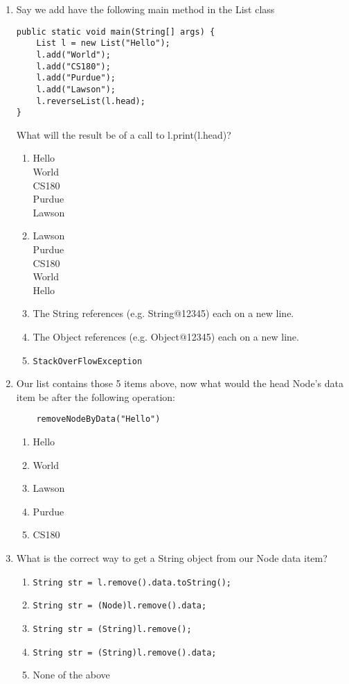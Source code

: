 \documentclass[S17-Final.tex]{subfiles}
\begin{document}
\begin{enumerate}
\item Say we add have the following main method in the List class
\begin{lstlisting}
public static void main(String[] args) {
    List l = new List("Hello");
    l.add("World");
    l.add("CS180");
    l.add("Purdue");
    l.add("Lawson");
    l.reverseList(l.head);
}
\end{lstlisting}
	
What will the result be of a call to l.print(l.head)?

\begin{enumerate}
\item  Hello\\
	    World\\
	    CS180\\
	    Purdue\\
	    Lawson \ifdraft \Ans \fi 
\item  Lawson\\
	    Purdue\\
	    CS180\\
    World\\
    Hello
\item  The String references (e.g. String@12345) each on a new line.
\item  The Object references (e.g. Object@12345) each on a new line.
\item  \texttt{StackOverFlowException}
\end{enumerate}
\clearpage
\item Our list contains those 5 items above, now what would the head Node's data item be after the following operation:
\begin{lstlisting}
    removeNodeByData("Hello")
\end{lstlisting}
	
\begin{enumerate}
\item  Hello 
\item  World
\item  Lawson \ifdraft \Ans \fi 
\item  Purdue
\item  CS180
\end{enumerate}

\item What is the correct way to get a String object from our Node data item?

\begin{enumerate}
\item  \texttt{String str = l.remove().data.toString();}
\item  \texttt{String str = (Node)l.remove().data;}
\item  \texttt{String str = (String)l.remove();}
\item  \texttt{String str = (String)l.remove().data;} \ifdraft \Ans \fi 
\item  None of the above
\end{enumerate}


\end{enumerate}
\end{document}
